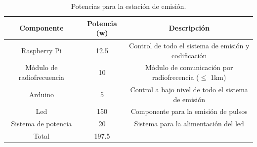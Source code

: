 \documentclass{scrreprt}
\begin{document}
\begin{table}[h!]
\begin{tabular}{|c|c|c|}
\hline 
\textbf{Componente} & \textbf{Potencia (w)} & \textbf{Descripción} \\ 
\hline 
Raspberry Pi & 12.5 & Control de todo el sistema de emisión y codificación \\ 
\hline 
Módulo de radiofrecuencia & 10 & Módulo de comunicación por radiofrecencia ($\le$ 1km)  \\ 
\hline 
Arduino & 5 & Control a bajo nivel de todo el sistema de emisión \\ 
\hline 
Led & 150 & Componente para la emisión de pulsos \\ 
\hline 
Sistema de potencia & 20 & Sistema para la alimentación del led \\ 
\hline 
 Total & 197.5 &  \\ 
\hline 
\end{tabular} 
\caption{Potencias para la estación de emisión.}
\label{tab:potenciaEmisor}
\end{table}
\end{document}
